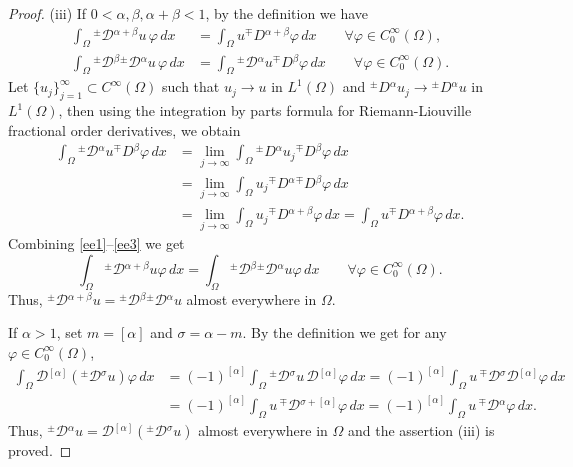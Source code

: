 \documentclass[leqno,final]{siamltex}
\numberwithin{equation}{section}
\renewcommand{\(}{\bigl(}
\renewcommand{\)}{\bigr)}
\begin{document}
\begin{proof}
	(iii) If $0<\alpha,\beta, \alpha+\beta<1$, by the definition we have 
		\begin{align}\label{ee1}
		\int_{\Omega} {^{\pm}}{\mathcal{D}}{^{\alpha+\beta}} u\, \varphi\,dx
		&=  \int_{\Omega} u {^{\mp}}{D}{^{\alpha + \beta}} \varphi\,dx \qquad\forall \varphi\in C^\infty_0(\Omega), \\
		\int_{\Omega} {^{\pm}}{\mathcal{D}}{^{\beta}} {^{\pm}}{\mathcal{D}}{^{\alpha}} u\, \varphi \,dx 
		&=  \int_{\Omega} {^{\pm}}{\mathcal{D}}{^{\alpha}} u {^{\mp}}{D}{^{\beta}} \varphi\,dx  \qquad\forall \varphi\in C^\infty_0(\Omega).\label{ee2} 
		\end{align}
		Let $\{u_j\}_{j=1}^{\infty} \subset C^\infty (\Omega)$ such that $u_j\to u$ in $L^1(\Omega)$ and ${^{\pm}}{D}{^{\alpha}}u_j \to {^{\pm}}{D}{^{\alpha}}u$ in $L^1(\Omega)$, then using the integration by parts formula for Riemann-Liouville fractional order derivatives, we obtain 
		\begin{align}\label{ee3}
		\int_{\Omega} {^{\pm}}{\mathcal{D}}{^{\alpha}} u {^{\mp}}{D}{^{\beta}} \varphi\,dx
		&= \lim_{j \rightarrow \infty} \int_{\Omega} {^{\pm}}{D}{^{\alpha}}u_j {^{\mp}}{D}{^{\beta}} \varphi\,dx\\
		&= \lim_{j \rightarrow \infty}  \int_{\Omega}  u_j {^{\mp}}{D}{^{\alpha}}{^{\mp}}{D}{^{\beta}} \varphi\,dx \nonumber\\
		&= \lim_{j \rightarrow \infty}  \int_{\Omega}  u_j {^{\mp}}{D}{^{\alpha+\beta}}  \varphi\,dx
		=   \int_{\Omega}  u {^{\mp}}{D}{^{\alpha+\beta}}  \varphi\,dx. \nonumber
 		\end{align}
 		Combining \eqref{ee1}--\eqref{ee3} we get 
 		\[
 		\int_{\Omega} {^{\pm}}{\mathcal{D}}{^{\alpha+\beta}} u \varphi\,dx
 		= \int_{\Omega} {^{\pm}}{\mathcal{D}}{^{\beta}} {^{\pm}}{\mathcal{D}}{^{\alpha}} u \varphi\,dx
 		\qquad\forall \varphi\in C^\infty_0(\Omega).
 		\]
 		Thus, ${^{\pm}}{\mathcal{D}}{^{\alpha+\beta}} u=  {^{\pm}}{\mathcal{D}}{^{\beta}} {^{\pm}}{\mathcal{D}}{^{\alpha}} u$ almost everywhere in $\Omega$. 
 		
 		If $\alpha>1$, set $m=[\alpha]$ and $\sigma=\alpha-m$. By the definition we get for any $\varphi\in C^\infty_0(\Omega)$,
 		\begin{align*}
 		\int_{\Omega} {\mathcal{D}}{^{[\alpha]}} ({^{\pm}}{\mathcal{D}}{^{\sigma}} u) \varphi\,dx
 		&=(-1)^{[\alpha]} \int_{\Omega}   {^{\pm}}{\mathcal{D}}{^{\sigma}} u \, {\mathcal{D}}{^{[\alpha]}} \varphi\,dx
 		=(-1)^{[\alpha]} \int_{\Omega}     u  \, {^{\mp}}{\mathcal{D}}{^{\sigma}}  {\mathcal{D}}{^{[\alpha]}} \varphi\,dx \\
 		&=(-1)^{[\alpha]} \int_{\Omega}     u  \, {^{\mp}}{\mathcal{D}}{^{\sigma +[\alpha]}} \varphi\,dx 
 		=(-1)^{[\alpha]} \int_{\Omega}  u  \, {^{\mp}}{\mathcal{D}}{^\alpha} \varphi\,dx.
 		\end{align*}
 		Thus, ${^{\pm}}{\mathcal{D}}{^{\alpha}} u
 		 =  {\mathcal{D}}{^{[\alpha]}} ({^{\pm}}{\mathcal{D}}{^{\sigma}} u)$ almost everywhere in $\Omega$ and
        the assertion (iii) is proved. 
 

\end{proof}
\end{document}

